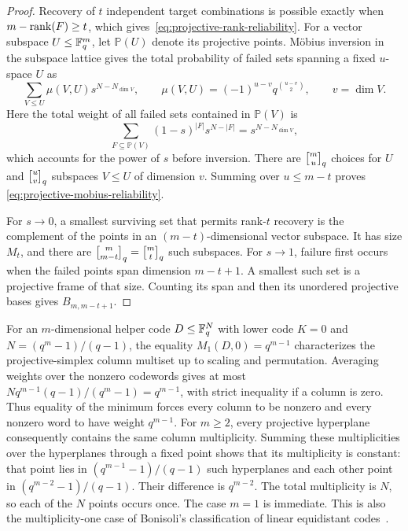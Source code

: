\begin{proof}
Recovery of $t$ independent target combinations is possible exactly when
$m-\operatorname{rank}(F)\geq t$, which gives~\eqref{eq:projective-rank-reliability}.
For a vector subspace $U\leq\mathbb F_q^m$, let $\mathbb P(U)$ denote its projective
points.  M\"obius inversion in the subspace lattice
\cite[Proposition~3.7.1 and Example~3.10.2]{Stanley2012} gives the total
probability of failed sets spanning a fixed $u$-space $U$ as
\[
 \sum_{V\leq U}\mu(V,U)s^{N-N_{\dim V}},
 \qquad
 \mu(V,U)=(-1)^{u-v}q^{\binom{u-v}{2}},
 \qquad v=\dim V.
\]
Here the total weight of all failed sets contained in $\mathbb P(V)$ is
\[
 \sum_{F\subseteq\mathbb P(V)}(1-s)^{|F|}s^{N-|F|}
 =s^{N-N_{\dim V}},
\]
which accounts for the power of $s$ before inversion.
There are $\qbinom{m}{u}$ choices for $U$ and $\qbinom{u}{v}$ subspaces
$V\leq U$ of dimension $v$.  Summing over $u\leq m-t$ proves
\eqref{eq:projective-mobius-reliability}.

For $s\to0$, a smallest surviving set that permits rank-$t$ recovery is the
complement of the points in an $(m-t)$-dimensional vector subspace.  It has
size $M_t$, and there are $\qbinom{m}{m-t}=\qbinom{m}{t}$ such subspaces.
For $s\to1$, failure first occurs when the failed points span dimension
$m-t+1$.  A smallest such set is a projective frame of that size.  Counting
its span and then its unordered projective bases gives $B_{m,m-t+1}$.
%
%
%
\end{proof}

For an $m$-dimensional helper code $D\leq\mathbb F_q^N$ with lower code
$K=0$ and $N=(q^m-1)/(q-1)$, the equality $M_1(D,0)=q^{m-1}$
characterizes the projective-simplex column multiset up to scaling and
permutation.  Averaging weights over the nonzero codewords gives at most
$Nq^{m-1}(q-1)/(q^m-1)=q^{m-1}$, with strict inequality if a column is
zero.  Thus equality of the minimum forces every column to be nonzero and
every nonzero word to have weight $q^{m-1}$.  For $m\geq2$, every
projective hyperplane consequently contains the same column multiplicity.
Summing these multiplicities over the hyperplanes through a fixed point
shows that its multiplicity is constant: that point lies in
$(q^{m-1}-1)/(q-1)$ such hyperplanes and each other point in
$(q^{m-2}-1)/(q-1)$.  Their difference is $q^{m-2}$.
The total multiplicity is $N$, so each of the $N$ points occurs once.
The case $m=1$ is immediate.  This is also the multiplicity-one case of
Bonisoli's classification of linear equidistant codes~\cite{Bonisoli1984}.
